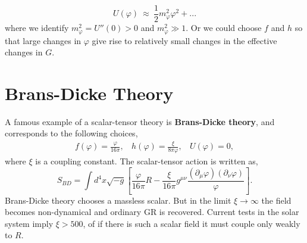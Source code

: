 \begin{equation}
    U(\varphi) \ \approx\  \frac{1}{2}m_{\varphi}^2\varphi^2 + ...
\end{equation}
where we identify $m_{\varphi}^2 = U''(0)>0$ and $m_{\varphi}^2\gg 1$. Or we could choose $f$ and $h$ so that large changes in $\varphi$ give rise to relatively small changes in the effective changes in $G$. 

\section{Brans-Dicke Theory}
A famous example of a scalar-tensor theory is \textbf{Brans-Dicke theory}, and corresponds to the following choices,
\begin{eqnarray}
    f(\varphi) = \frac{\varphi}{16\pi},\ \ \ \ h(\varphi) = \frac{\xi}{8\pi\varphi},\ \ \ \ U(\varphi) = 0, 
\end{eqnarray}
where $\xi$ is a coupling constant. The scalar-tensor action is written as, 
\begin{equation}
    S_{BD} = \int d^4x\sqrt{-g}\left[\frac{\varphi}{16\pi}R -\frac{\xi}{16\pi}g^{\mu\nu}\frac{(\partial_{\mu}\varphi)(\partial_{\nu}\varphi)}{\varphi}\right].
\end{equation}
Brans-Dicke theory chooses a massless scalar. But in the limit $\xi\rightarrow \infty$ the field becomes non-dynamical and ordinary GR is recovered. Current tests in the solar system imply $\xi>500$, of if there is such a scalar field it must couple only weakly to $R$. 

